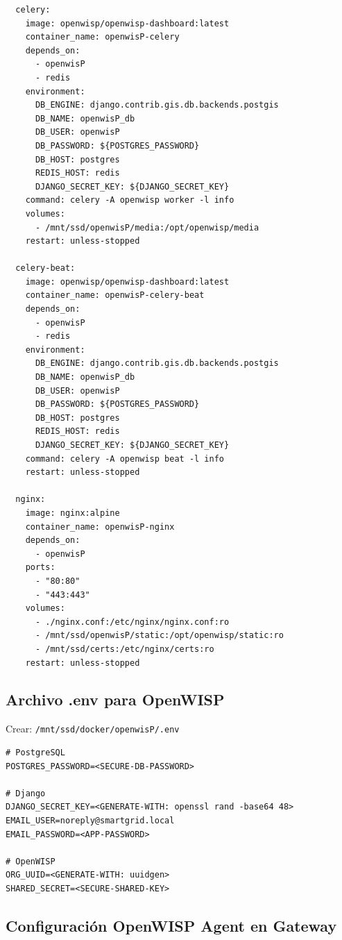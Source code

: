 \begin{verbatim}
  celery:
    image: openwisp/openwisp-dashboard:latest
    container_name: openwisP-celery
    depends_on:
      - openwisP
      - redis
    environment:
      DB_ENGINE: django.contrib.gis.db.backends.postgis
      DB_NAME: openwisP_db
      DB_USER: openwisP
      DB_PASSWORD: ${POSTGRES_PASSWORD}
      DB_HOST: postgres
      REDIS_HOST: redis
      DJANGO_SECRET_KEY: ${DJANGO_SECRET_KEY}
    command: celery -A openwisp worker -l info
    volumes:
      - /mnt/ssd/openwisP/media:/opt/openwisp/media
    restart: unless-stopped

  celery-beat:
    image: openwisp/openwisp-dashboard:latest
    container_name: openwisP-celery-beat
    depends_on:
      - openwisP
      - redis
    environment:
      DB_ENGINE: django.contrib.gis.db.backends.postgis
      DB_NAME: openwisP_db
      DB_USER: openwisP
      DB_PASSWORD: ${POSTGRES_PASSWORD}
      DB_HOST: postgres
      REDIS_HOST: redis
      DJANGO_SECRET_KEY: ${DJANGO_SECRET_KEY}
    command: celery -A openwisp beat -l info
    restart: unless-stopped

  nginx:
    image: nginx:alpine
    container_name: openwisP-nginx
    depends_on:
      - openwisP
    ports:
      - "80:80"
      - "443:443"
    volumes:
      - ./nginx.conf:/etc/nginx/nginx.conf:ro
      - /mnt/ssd/openwisP/static:/opt/openwisp/static:ro
      - /mnt/ssd/certs:/etc/nginx/certs:ro
    restart: unless-stopped
\end{verbatim}

\subsection{Archivo .env para OpenWISP}

Crear: \texttt{/mnt/ssd/docker/openwisP/.env}

\begin{verbatim}
# PostgreSQL
POSTGRES_PASSWORD=<SECURE-DB-PASSWORD>

# Django
DJANGO_SECRET_KEY=<GENERATE-WITH: openssl rand -base64 48>
EMAIL_USER=noreply@smartgrid.local
EMAIL_PASSWORD=<APP-PASSWORD>

# OpenWISP
ORG_UUID=<GENERATE-WITH: uuidgen>
SHARED_SECRET=<SECURE-SHARED-KEY>
\end{verbatim}

\subsection{Configuración OpenWISP Agent en Gateway}

